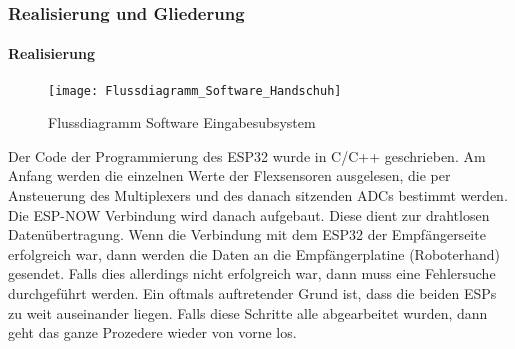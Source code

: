 \documentclass[titlepage,12pt,twoside]{article}
\begin{document}
\subsubsection{Realisierung und Gliederung}
\paragraph{Realisierung}
\hfill \break
\hfill \break
\begin{figure}[H]
	\begin{center}
		\scalebox{0.5}
		{\texttt{[image: Flussdiagramm\_Software\_Handschuh]}}
		\caption{Flussdiagramm Software Eingabesubsystem}
		\label{fig:Flussdiagramm_Software_Handschuh}			
	\end{center}
\end{figure}
\hfill \break
Der Code der Programmierung des ESP32 wurde in C/C++ geschrieben. Am Anfang werden die einzelnen Werte der Flexsensoren 
ausgelesen, die per Ansteuerung des Multiplexers und des danach sitzenden ADCs bestimmt werden. Die ESP-NOW Verbindung wird 
danach aufgebaut. Diese dient zur drahtlosen Datenübertragung. Wenn die Verbindung mit dem ESP32 der Empfängerseite erfolgreich 
war, dann werden die Daten an die Empfängerplatine (Roboterhand) gesendet. Falls dies allerdings nicht erfolgreich war, dann 
muss eine Fehlersuche durchgeführt werden. Ein oftmals auftretender Grund ist, dass die beiden ESPs zu weit auseinander liegen. 
Falls diese Schritte alle abgearbeitet wurden, dann geht das ganze Prozedere wieder von vorne los. \\
\\
\end{document}
